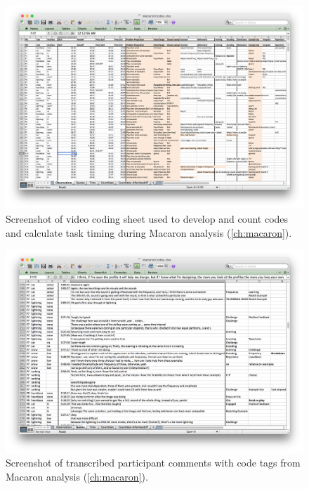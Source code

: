 	\begin{figure}[htbp] %
	   \centering
	   \includegraphics[width=0.9\textheight,angle=90]{Chapter99-SupportingMaterials/MethodExamples/MacaronCoding} 
	   \caption{Screenshot of video coding sheet used to develop and count codes and calculate task timing during Macaron analysis (\autoref{ch:macaron}).}
	   \label{fig:SupportingMaterials:MethodExamples:MacaronCoding}
	\end{figure}


	\begin{figure}[htbp] %
	   \centering
	   \includegraphics[width=0.9\textheight,angle=90]{Chapter99-SupportingMaterials/MethodExamples/MacaronQuotes} 
	   \caption{Screenshot of transcribed participant comments with code tags from Macaron analysis (\autoref{ch:macaron}).}
	   \label{fig:SupportingMaterials:MethodExamples:MacaronQuotes}
	\end{figure}


